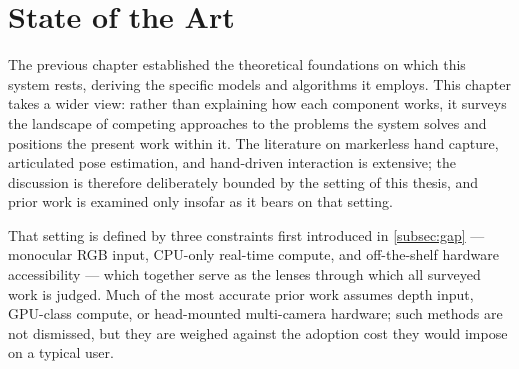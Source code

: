 
\section{State of the Art}\label{sec:sota}

The previous chapter established the theoretical foundations on which this
system rests, deriving the specific models and algorithms it employs.
This chapter takes a wider view: rather than explaining how each component
works, it surveys the landscape of competing approaches to the problems the
system solves and positions the present work within it.
The literature on markerless hand capture, articulated pose estimation, and
hand-driven interaction is extensive; the discussion is therefore deliberately
bounded by the setting of this thesis, and prior work is examined only insofar
as it bears on that setting.

That setting is defined by three constraints first introduced in
\autoref{subsec:gap} --- monocular RGB input, CPU-only real-time compute, and
off-the-shelf hardware accessibility --- which together serve as the lenses
through which all surveyed work is judged.
Much of the most accurate prior work assumes depth input, GPU-class compute, or
head-mounted multi-camera hardware; such methods are not dismissed, but they
are weighed against the adoption cost they would impose on a typical user.
